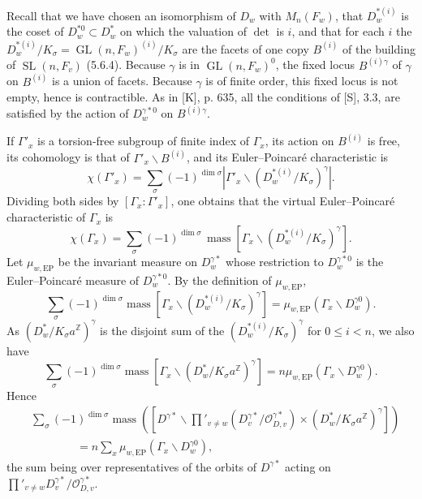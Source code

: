 \documentclass[10pt]{article}
\newcommand{\Z}{\mathbb Z}
\newcommand{\GL}{\operatorname{GL}}
\newcommand{\SL}{\operatorname{SL}}
\newcommand{\mass}{\operatorname{mass}}
\theoremstyle{deligne}
\newcommand{\heading}[1]{\vspace{0.7em}\noindent{\bfseries #1}\quad}
\begin{document}
\heading{5.15.} Recall that we have chosen an isomorphism of $D_w$ with $M_n(F_w)$, that $D_w^{*(i)}$ is the coset of $D_w^{*0}\subset D_w^*$ on which the valuation of $\det$ is $i$, and that for each $i$ the $D_w^{*(i)}/K_\sigma=\GL(n,F_w)^{(i)}/K_\sigma$ are the facets of one copy $B^{(i)}$ of the building of $\SL(n,F_v)$ (5.6.4). Because $\gamma$ is in $\GL(n,F_w)^0$, the fixed locus $B^{(i)\gamma}$ of $\gamma$ on $B^{(i)}$ is a union of facets. Because $\gamma$ is of finite order, this fixed locus is not empty, hence is contractible. As in [K], p. 635, all the conditions of [S], 3.3, are satisfied by the action of $D_w^{\gamma *0}$ on $B^{(i)\gamma}$.

If $\Gamma'_x$ is a torsion-free subgroup of finite index of $\Gamma_x$, its action on $B^{(i)}$ is free, its cohomology is that of $\Gamma'_x\backslash B^{(i)}$, and its Euler--Poincar\'e characteristic is
\[
\chi(\Gamma'_x)=\sum_\sigma(-1)^{\dim\sigma}\left|\Gamma'_x\backslash(D_w^{*(i)}/K_\sigma)^\gamma\right|.
\]
Dividing both sides by $[\Gamma_x:\Gamma'_x]$, one obtains that the virtual Euler--Poincar\'e characteristic of $\Gamma_x$ is
\begin{equation}\tag{5.15.1}
\chi(\Gamma_x)=\sum_\sigma(-1)^{\dim\sigma}\,
\mass[\Gamma_x\backslash(D_w^{*(i)}/K_\sigma)^\gamma].
\end{equation}
Let $\mu_{w,\mathrm{EP}}$ be the invariant measure on $D_w^{\gamma *}$ whose restriction to $D_w^{\gamma *0}$ is the Euler--Poincar\'e measure of $D_w^{\gamma *0}$. By the definition of $\mu_{w,\mathrm{EP}}$,
\[
\sum_\sigma(-1)^{\dim\sigma}\mass[\Gamma_x\backslash(D_w^{*(i)}/K_\sigma)^\gamma]
=\mu_{w,\mathrm{EP}}(\Gamma_x\backslash D_w^{\gamma 0}).
\]
As $(D_w^*/K_\sigma a^\Z)^\gamma$ is the disjoint sum of the $(D_w^{*(i)}/K_\sigma)^\gamma$ for $0\le i<n$, we also have
\[
\sum_\sigma(-1)^{\dim\sigma}\mass[\Gamma_x\backslash(D_w^*/K_\sigma a^\Z)^\gamma]
=n\mu_{w,\mathrm{EP}}(\Gamma_x\backslash D_w^{\gamma 0}).
\]
Hence
\begin{equation}\tag{5.15.2}
\begin{aligned}
&\sum_\sigma(-1)^{\dim\sigma}\mass\left([D^{\gamma *}\backslash
\prod'_{v\ne w}(D_v^{\gamma *}/\mathcal O_{D,v}^{\gamma *})\times(D_w^*/K_\sigma a^\Z)^\gamma]\right)\\
&\hspace{4em}=n\sum_x \mu_{w,\mathrm{EP}}(\Gamma_x\backslash D_w^{\gamma 0}),
\end{aligned}
\end{equation}
the sum being over representatives of the orbits of $D^{\gamma *}$ acting on $\prod'_{v\ne w}D_v^{\gamma *}/\mathcal O_{D,v}^{\gamma *}$.
\end{document}
